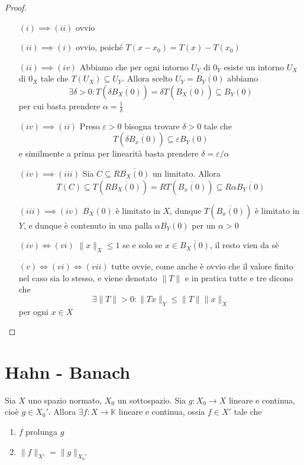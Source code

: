 \begin{proof}{} \( \)
\begin{itemize}[label = --]
    \item[\((i) \implies (ii)\)] ovvio
    \item[\((ii)\implies (i)\) ] ovvio, poiché \(T{(x-x_{0})} = T{(x)} - T{(x_{0})}\) 
    \item[\((ii) \implies (iv)\)] Abbiamo che per ogni intorno \(U_Y\) di \(0_Y\) esiste un intorno \(U_X\) di \(0_X\) tale che \(T{(U_X)} \subseteq U_Y \). Allora scelto \(U_Y = \overline{B_Y{(0)}}\) abbiamo
        \[
          \exists \delta > 0 : T{(\delta\overline{B_X{(0)}})} = \delta T{(\overline{B_X{(0)}})}\subseteq B_Y{(0)} 
        \]
        per cui basta prendere \(\alpha = \frac{1}{\delta}\) 
    \item[\((iv) \implies (ii)\)] Preso \(\varepsilon > 0\) bisogna trovare \(\delta>0\) tale che 
        \[
          T{(\delta \overline{B_x{(0)}})} \subseteq \varepsilon B_Y{(0)} 
        \]
        e similmente a prima per linearità basta prendere \(\delta = \varepsilon / \alpha\) 
    \item[\((iv) \implies (iii)\)] Sia \(C \subseteq R \overline{B_X{(0)}} \) un
        limitato. Allora
        \[
          T{(C)} \subseteq T{(R \overline{B_X{(0)}})} = RT{(\overline{B_x{(0)}})} \subseteq R \alpha \overline{B_Y{(0)}}  
        \]
    \item[\((iii) \implies (iv)\)] \(\overline{B_X}{(0)}\) è limitato in \(X\),
        dunque \(T{(\overline{B_x{(0)}})}\) è limitato in \(Y\), e dunque è
        contenuto in una palla \(\alpha B_Y{(0)}\) per un \(\alpha > 0\) 
    \item[\((iv) \iff (vi)\)] \(\|x\|_X \le 1\) se e solo se \(x \in \overline{B_X{(0)}}\), il resto vien da sè
    \item[\((v) \iff (vi) \iff (vii)\)] tutte ovvie, come anche è ovvio che il
        valore finito nel caso sia lo stesso, e viene denotato \(\|T\| \) e in pratica tutte e tre dicono che \[\exists \|T\| > 0 : \|Tx\|_Y \le \|T\| \|x\|_X \] per ogni \(x \in X\) 
\end{itemize}
\end{proof}

\section{Hahn - Banach}
\begin{theorem}
    Sia \(X\) uno spazio normato, \(X_{0}\) un sottospazio. Sia \(g : X_{0} \to X\) lineare e continua, cioè \(g \in X_{0}'\). Allora \(\exists f: X \to \mathbb{K}\) lineare e continua, ossia \(f \in X'\) tale che
\begin{enumerate}[label = \arabic*)]
    \item \(f\) prolunga \(g\) 
    \item \(\|f\|_{X'} = \|g\|_{X_{0}'}\)
\end{enumerate}
\end{theorem}

